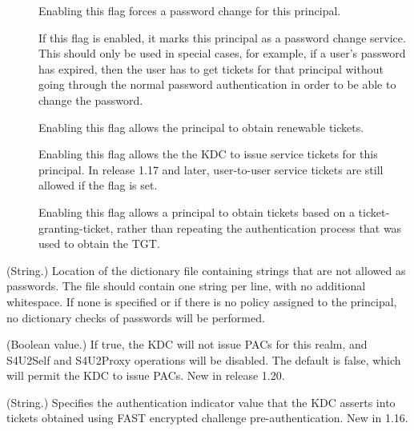 \documentclass[letterpaper,10pt,english]{sphinxmanual}
\begin{document}
\begin{description}
\begin{description}
\item[{}] \leavevmode
Enabling this flag forces a password change for this
principal.

\item[{}] \leavevmode
If this flag is enabled, it marks this principal as a password
change service.  This should only be used in special cases,
for example, if a user’s password has expired, then the user
has to get tickets for that principal without going through
the normal password authentication in order to be able to
change the password.

\item[{}] \leavevmode
Enabling this flag allows the principal to obtain renewable
tickets.

\item[{}] \leavevmode
Enabling this flag allows the the KDC to issue service tickets
for this principal.  In release 1.17 and later, user-to-user
service tickets are still allowed if the  flag is
set.

\item[{}] \leavevmode
Enabling this flag allows a principal to obtain tickets based
on a ticket-granting-ticket, rather than repeating the
authentication process that was used to obtain the TGT.

\end{description}

\item[{\sphinxstylestrong{dict\_file}}] \leavevmode
(String.)  Location of the dictionary file containing strings that
are not allowed as passwords.  The file should contain one string
per line, with no additional whitespace.  If none is specified or
if there is no policy assigned to the principal, no dictionary
checks of passwords will be performed.

\item[{\sphinxstylestrong{disable\_pac}}] \leavevmode
(Boolean value.)  If true, the KDC will not issue PACs for this
realm, and S4U2Self and S4U2Proxy operations will be disabled.
The default is false, which will permit the KDC to issue PACs.
New in release 1.20.

\item[{\sphinxstylestrong{encrypted\_challenge\_indicator}}] \leavevmode
(String.)  Specifies the authentication indicator value that the KDC
asserts into tickets obtained using FAST encrypted challenge
pre-authentication.  New in 1.16.


\end{description}
\end{document}
